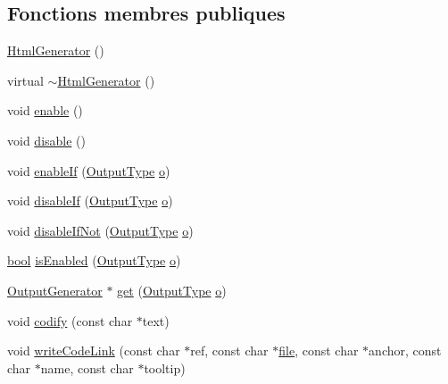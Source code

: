 \subsection*{Fonctions membres publiques}
\begin{DoxyCompactItemize}
\item 
\hyperlink{class_html_generator_a0dc05bee31f886b2b5d5318d0c0213a4}{Html\+Generator} ()
\item 
virtual \hyperlink{class_html_generator_a11d3c67df991a213ef94780d91367a12}{$\sim$\+Html\+Generator} ()
\item 
void \hyperlink{class_html_generator_a329452241150ab304dc08438851521de}{enable} ()
\item 
void \hyperlink{class_html_generator_abbcaec5ceb199f2c5f91c983d6482692}{disable} ()
\item 
void \hyperlink{class_html_generator_aee9e3887cd11cb8457f2549df91dadf1}{enable\+If} (\hyperlink{class_output_generator_ab79b5d3c19d95c8a5929c07f5b2918cf}{Output\+Type} \hyperlink{060__command__switch_8tcl_a495e7a4ede0831107e9d435080a7c268}{o})
\item 
void \hyperlink{class_html_generator_a93a1f46b032bba0f0971ca648d011b09}{disable\+If} (\hyperlink{class_output_generator_ab79b5d3c19d95c8a5929c07f5b2918cf}{Output\+Type} \hyperlink{060__command__switch_8tcl_a495e7a4ede0831107e9d435080a7c268}{o})
\item 
void \hyperlink{class_html_generator_a25743230b0993020e7962d589a242676}{disable\+If\+Not} (\hyperlink{class_output_generator_ab79b5d3c19d95c8a5929c07f5b2918cf}{Output\+Type} \hyperlink{060__command__switch_8tcl_a495e7a4ede0831107e9d435080a7c268}{o})
\item 
\hyperlink{qglobal_8h_a1062901a7428fdd9c7f180f5e01ea056}{bool} \hyperlink{class_html_generator_a22b1c974e6510a41a082d801606cefa0}{is\+Enabled} (\hyperlink{class_output_generator_ab79b5d3c19d95c8a5929c07f5b2918cf}{Output\+Type} \hyperlink{060__command__switch_8tcl_a495e7a4ede0831107e9d435080a7c268}{o})
\item 
\hyperlink{class_output_generator}{Output\+Generator} $\ast$ \hyperlink{class_html_generator_add83ad0454d010cc31da65d1bfff3c8a}{get} (\hyperlink{class_output_generator_ab79b5d3c19d95c8a5929c07f5b2918cf}{Output\+Type} \hyperlink{060__command__switch_8tcl_a495e7a4ede0831107e9d435080a7c268}{o})
\item 
void \hyperlink{class_html_generator_a574ab87e7aa9b92c11248027912851bc}{codify} (const char $\ast$text)
\item 
void \hyperlink{class_html_generator_a91b156be8ac84d8a2a8a88e7adf0869b}{write\+Code\+Link} (const char $\ast$ref, const char $\ast$\hyperlink{class_output_generator_aed5ad11c3844cdf71ec6fee6c1c84286}{file}, const char $\ast$anchor, const char $\ast$name, const char $\ast$tooltip)

\end{DoxyCompactItemize}
